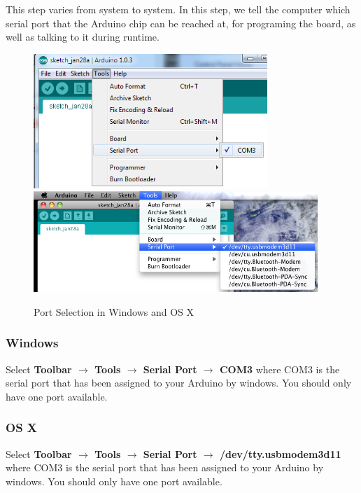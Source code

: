 \documentclass[11pt,a4paper]{article}
\begin{document}
\label{sub:selecting_a_serial_port}
This step varies from system to system.  In this step, we tell the computer which serial port that the Arduino chip can be reached at, for programing the board, as well as talking to it during runtime.
    \begin{figure}[htbp]
        \centering
            \includegraphics[height=2in]{figures/port-windows.png}
            \includegraphics[height=1.5in]{figures/port-osx.png}
        \caption{Port Selection in Windows and OS X}
        \label{fig:figures_port}
    \end{figure}

\subsubsection{Windows} %

\label{ssub:windows}
Select \textbf{Toolbar $\rightarrow$ Tools $\rightarrow$ Serial Port $\rightarrow$ COM3} where COM3 is the serial port that has been assigned to your Arduino by windows.  You should only have one port available.


\subsubsection{OS X} %
\label{ssub:os_x}
Select \textbf{Toolbar $\rightarrow$ Tools $\rightarrow$ Serial Port $\rightarrow$ /dev/tty.usbmodem3d11} where COM3 is the serial port that has been assigned to your Arduino by windows.  You should only have one port available.
\end{document}
